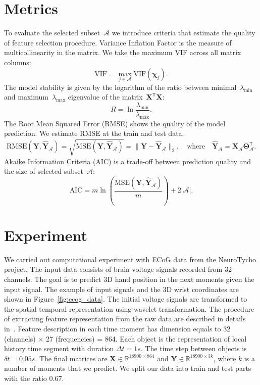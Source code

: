 \documentclass[12pt,twoside]{article}
\theoremstyle{definition}
\newcommand{\bY}{\mathbf{Y}}
\newcommand{\bX}{\mathbf{X}}
\newcommand{\bbR}{\mathbb{R}}
\newcommand{\cA}{\mathcal{A}}
\newcommand{\T}{\mathsf{T}}
\newcommand{\bchi}{\boldsymbol{\chi}}
\newcommand{\bTheta}{\boldsymbol{\Theta}}
\begin{document}
\section{Metrics}

To evaluate the selected subset~$\cA$ we introduce criteria that estimate the quality of feature selection procedure.
Variance Inflation Factor is the measure of multicollinearity in the matrix. We take the maximum VIF across all matrix columns:
\[
	\text{VIF} = \max_{j \in \cA} \text{VIF} (\bchi_j).
\]
The model stability is given by the logarithm of the ratio between minimal~$\lambda_{\min}$ and maximum~$\lambda_{\max}$ eigenvalue of the matrix~$\bX^{\T} \bX$:
\[
	R = \ln \frac{\lambda_{\min}}{\lambda_{\max}}.
\]
The Root Mean Squared Error (RMSE) shows the quality of the model prediction. We estimate RMSE at the train and test data.
\[
	\text{RMSE}(\bY, \widehat{\bY}_{\cA}) = \sqrt{\text{MSE} (\bY, \widehat{\bY}_{\cA})} =  \| \bY - \widehat{\bY}_{\cA} \|_2, \quad \text{where} \quad \widehat{\bY}_{\cA} = \bX_{\cA} \bTheta_{\cA}^{\T}.
\]
Akaike Information Criteria (AIC) is a trade-off between prediction quality and the size of selected subset~$\cA$:
\[
	\text{AIC} = m \ln \left( \frac{\text{MSE} ( \bY, \widehat{\bY}_{\cA})}{m}\right) + 2 | \cA |.
\]

\section{Experiment}
We carried out computational experiment with ECoG data from the NeuroTycho project. The input data consists of brain voltage signals recorded from 32 channels.
The goal is to predict 3D hand position in the next moments given the input signal.
The example of input signals and the 3D wrist coordinates are shown in Figure~\ref{fig:ecog_data}.
The initial voltage signals are transformed to the spatial-temporal representation using wavelet transformation.
The procedure of extracting feature representation from the raw data are described in details in~\cite{chao2010long,eliseyev2016penalized}.
Feature description in each time moment has dimension equals to 32 (channels) $\times$ 27 (frequencies) = 864.
Each object is the representation of local history time segment with duration $\Delta t = 1s$. The time step between objects is $\delta t =  0.05s$.
The final matrices are $\bX \in \bbR^{18900 \times 864}$ and $\bY \in \bbR^{18900 \times 3k}$, where $k$ is a number of moments that we predict.
We split our data into train and test parts with the ratio 0.67.
\end{document}
